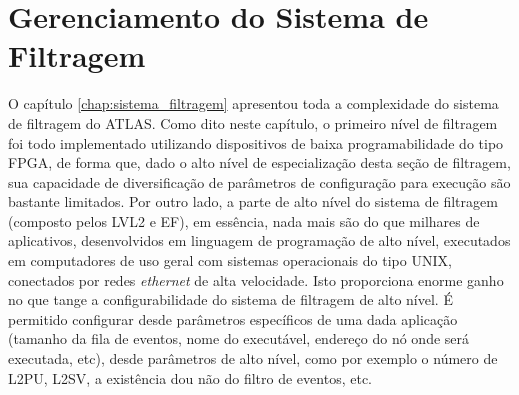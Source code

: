 \chapter{Gerenciamento do Sistema de Filtragem}
\label{chap:pm}

O capítulo \ref{chap:sistema_filtragem} apresentou toda a complexidade do sistema de filtragem do ATLAS. Como dito neste capítulo, o primeiro nível de filtragem foi todo implementado utilizando dispositivos de baixa programabilidade do tipo FPGA, de forma que, dado o alto nível de especialização desta seção de filtragem, sua capacidade de diversificação de parâmetros de configuração para execução são bastante limitados. Por outro lado, a parte de alto nível do sistema de filtragem (composto pelos LVL2 e EF), em essência, nada mais são do que milhares de aplicativos, desenvolvidos em linguagem de programação de alto nível, executados em computadores de uso geral com sistemas operacionais do tipo UNIX, conectados por redes \emph{ethernet} de alta velocidade. Isto proporciona enorme ganho no que tange a configurabilidade do sistema de filtragem de alto nível. É permitido configurar desde parâmetros específicos de uma dada aplicação (tamanho da fila de eventos, nome do executável, endereço do nó onde será executada, etc), desde parâmetros de alto nível, como por exemplo o número de L2PU, L2SV, a existência dou não do filtro de eventos, etc.


































































